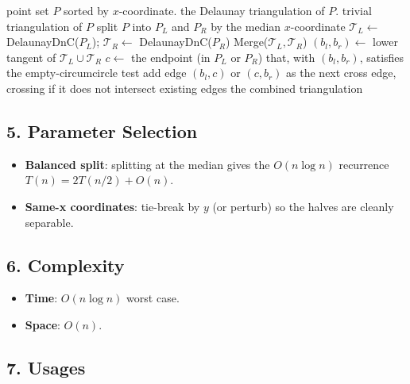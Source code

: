 \begin{algorithm}[htbp]
\caption{Divide-and-Conquer Delaunay (Guibas--Stolfi)}
\label{alg:delaunay_dnc}
\begin{algorithmic}[1]
\Require point set $P$ sorted by $x$-coordinate.
\Ensure the Delaunay triangulation of $P$.
    \State \Return trivial triangulation of $P$
  \EndIf
  \State split $P$ into $P_L$ and $P_R$ by the median $x$-coordinate
  \State $\mathcal{T}_L \gets $ DelaunayDnC($P_L$); \quad
         $\mathcal{T}_R \gets $ DelaunayDnC($P_R$)
  \State \Return Merge($\mathcal{T}_L, \mathcal{T}_R$)
\EndFunction
{}
  \State $(b_l, b_r) \gets $ lower tangent of $\mathcal{T}_L \cup \mathcal{T}_R$
  \Repeat
    \State $c \gets $ the endpoint (in $P_L$ or $P_R$) that, with $(b_l,b_r)$,
           satisfies the empty-circumcircle test
    \State add edge $(b_l,c)$ or $(c,b_r)$ as the next cross edge, crossing if
           it does not intersect existing edges
  \State \Return the combined triangulation
\EndFunction
\end{algorithmic}
\end{algorithm}

\subsection{5. Parameter Selection}

\begin{itemize}
\item \textbf{Balanced split}: splitting at the median gives the $O(n \log n)$
  recurrence $T(n) = 2T(n/2) + O(n)$.
\item \textbf{Same-x coordinates}: tie-break by $y$ (or perturb) so the halves
  are cleanly separable.
\end{itemize}

\subsection{6. Complexity}

\begin{itemize}
\item \textbf{Time}: $O(n \log n)$ worst case.
\item \textbf{Space}: $O(n)$.
\end{itemize}

\subsection{7. Usages}

